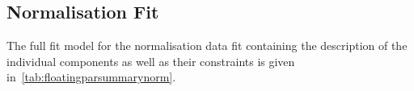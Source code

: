 %

\subsection{Normalisation Fit}
\label{normfit}
The full fit model for the normalisation data fit containing the description of the individual components as well as their constraints is given in~\autoref{tab:floatingparsummarynorm}. 



